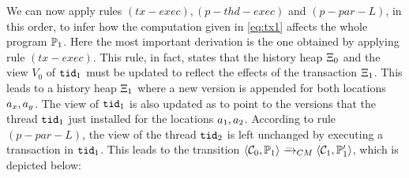 \documentclass[a4paper,UKenglish]{article}%
\theoremstyle{plain}
\begin{document}
We can now apply rules $(tx-exec), (p-thd-exec)$ and $(p-par-L)$, in this order, 
to infer how the computation given in \eqref{eq:tx1} affects the whole program $\mathbb{P}_1$. Here the most important 
derivation is the one obtained by applying rule $(tx-exec)$. This rule, in fact, states that the history 
heap $\Xi_0$ and the view $V_0$ of $\mathtt{tid}_1$ must be updated to reflect the effects of the 
transaction $\Xi_1$. This leads to a history heap $\Xi_1$ where a new version is appended for 
both locations $a_x, a_y$. The view of $\mathtt{tid}_1$ is also updated as to point to the versions 
that the thread $\mathtt{tid}_1$ just installed for the locations $a_1, a_2$. According to rule 
$(p-par-L)$, the view of the thread $\mathtt{tid}_2$ is left unchanged by executing a transaction in $\mathtt{tid}_1$. 
This leads to the transition $\langle \mathcal{C}_0, \mathbb{P}_1 \rangle \xrightarrow{\_}_{CM} \langle 
\mathcal{C}_1, \mathbb{P}_1' \rangle$, which is depicted below: 
\end{document}
